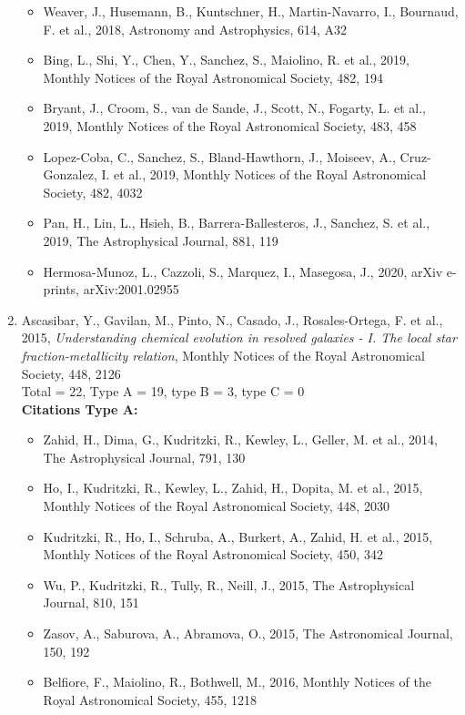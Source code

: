 \documentclass{letter}
\begin{document}
\begin{enumerate}
\begin{itemize}
\item Weaver, J., Husemann, B., Kuntschner, H., Martin-Navarro, I., Bournaud, F. et al., 2018, Astronomy and Astrophysics, 614, A32
\item Bing, L., Shi, Y., Chen, Y., Sanchez, S., Maiolino, R. et al., 2019, Monthly Notices of the Royal Astronomical Society, 482, 194
\item Bryant, J., Croom, S., van de Sande, J., Scott, N., Fogarty, L. et al., 2019, Monthly Notices of the Royal Astronomical Society, 483, 458
\item Lopez-Coba, C., Sanchez, S., Bland-Hawthorn, J., Moiseev, A., Cruz-Gonzalez, I. et al., 2019, Monthly Notices of the Royal Astronomical Society, 482, 4032
\item Pan, H., Lin, L., Hsieh, B., Barrera-Ballesteros, J., Sanchez, S. et al., 2019, The Astrophysical Journal, 881, 119
\item Hermosa-Munoz, L., Cazzoli, S., Marquez, I., Masegosa, J., 2020, arXiv e-prints, arXiv:2001.02955
\end{itemize}
\item Ascasibar, Y., Gavilan, M., Pinto, N., Casado, J., Rosales-Ortega, F. et al., 2015, {\it Understanding chemical evolution in resolved galaxies - I. The local star fraction-metallicity relation}, Monthly Notices of the Royal Astronomical Society, 448, 2126 \\ 
Total = 22, Type A = 19, type B = 3, type C = 0 \\ 
{\bf Citations Type A:}
\begin{itemize}
\item Zahid, H., Dima, G., Kudritzki, R., Kewley, L., Geller, M. et al., 2014, The Astrophysical Journal, 791, 130
\item Ho, I., Kudritzki, R., Kewley, L., Zahid, H., Dopita, M. et al., 2015, Monthly Notices of the Royal Astronomical Society, 448, 2030
\item Kudritzki, R., Ho, I., Schruba, A., Burkert, A., Zahid, H. et al., 2015, Monthly Notices of the Royal Astronomical Society, 450, 342
\item Wu, P., Kudritzki, R., Tully, R., Neill, J., 2015, The Astrophysical Journal, 810, 151
\item Zasov, A., Saburova, A., Abramova, O., 2015, The Astronomical Journal, 150, 192
\item Belfiore, F., Maiolino, R., Bothwell, M., 2016, Monthly Notices of the Royal Astronomical Society, 455, 1218

\end{itemize}
\end{enumerate}
\end{document}
